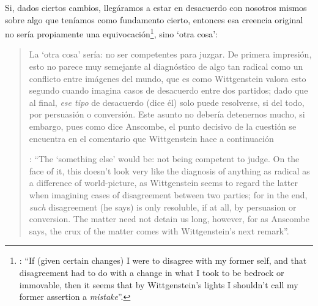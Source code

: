 Si, dados ciertos cambios, llegáramos a estar en desacuerdo con nosotros mismos sobre algo que teníamos como fundamento cierto, entonces esa creencia original no sería propiamente una equivocación\footnote{\cite[Cf.][223]{teichmann2008ans}: \enquote{If (given certain changes) I were to disagree with my former self, and that disagreement had to do with a change in what I took to be bedrock or immovable, then it seems that by Wittgenstein's lights I shouldn't call my former assertion a \emph{mistake}}.}, sino `otra cosa': \blockquote[{\Cite[Cf.][223]{teichmann2008ans}}: \enquote{The `something else' would be: not being competent to judge. On the face of it, this doesn't look very like the diagnosis of anything as radical as a difference of world-picture, as Wittgenstein seems to regard the latter when imagining cases of disagreement between two parties; for in the end, \emph{such} disagreement (he says) is only resoluble, if at all, by persuasion or conversion. \textelp{} The matter need not detain us long, however, for as Anscombe says, the crux of the matter comes with Wittgenstein's next remark}.]{La `otra cosa' sería: no ser competentes para juzgar. De primera impresión, esto no parece muy semejante al diagnóstico de algo tan radical como un conflicto entre imágenes del mundo, que es como Wittgenstein valora esto segundo cuando imagina casos de desacuerdo entre dos partidos; dado que al final, \emph{ese tipo} de desacuerdo (dice él) solo puede resolverse, si del todo, por persuasión o conversión. \textelp{} Este asunto no debería detenernos mucho, si embargo, pues como dice Anscombe, el punto decisivo de la cuestión se encuentra en el comentario que Wittgenstein hace a continuación}.

